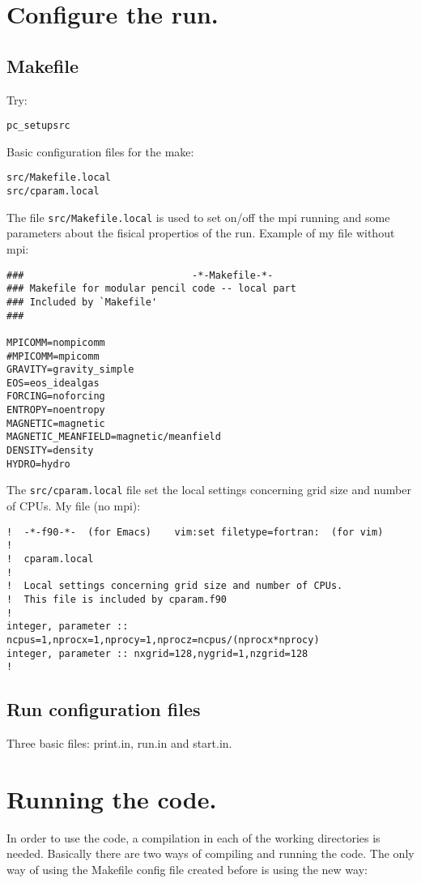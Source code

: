 \documentclass[a4paper,12pt]{article}
\begin{document}
\section{Configure the run.}

\subsection{Makefile}
Try:
\begin{verbatim}
pc_setupsrc
\end{verbatim}

Basic configuration files for the make:
\begin{verbatim}
src/Makefile.local
src/cparam.local
\end{verbatim}
The file \texttt{src/Makefile.local} is used to set on/off the mpi running and
some parameters about the fisical propertios of the run. Example of my file
without mpi:
\begin{verbatim}
###                             -*-Makefile-*-
### Makefile for modular pencil code -- local part
### Included by `Makefile'
###

MPICOMM=nompicomm
#MPICOMM=mpicomm
GRAVITY=gravity_simple
EOS=eos_idealgas
FORCING=noforcing
ENTROPY=noentropy
MAGNETIC=magnetic
MAGNETIC_MEANFIELD=magnetic/meanfield
DENSITY=density
HYDRO=hydro
\end{verbatim}

The \texttt{src/cparam.local} file set the local settings concerning grid size
and number of CPUs. My file (no mpi):
\begin{verbatim}
!  -*-f90-*-  (for Emacs)    vim:set filetype=fortran:  (for vim)
!
!  cparam.local
!
!  Local settings concerning grid size and number of CPUs.
!  This file is included by cparam.f90
!
integer, parameter :: ncpus=1,nprocx=1,nprocy=1,nprocz=ncpus/(nprocx*nprocy)
integer, parameter :: nxgrid=128,nygrid=1,nzgrid=128
!
\end{verbatim}

\subsection{Run configuration files}
Three basic files: print.in, run.in and start.in.


\section{Running the code.}

In order to use the code, a compilation in each of the working directories is
needed. Basically there are two ways of compiling and running the code.
The only way of using the Makefile config file created before is using the new
way:
\end{document}
